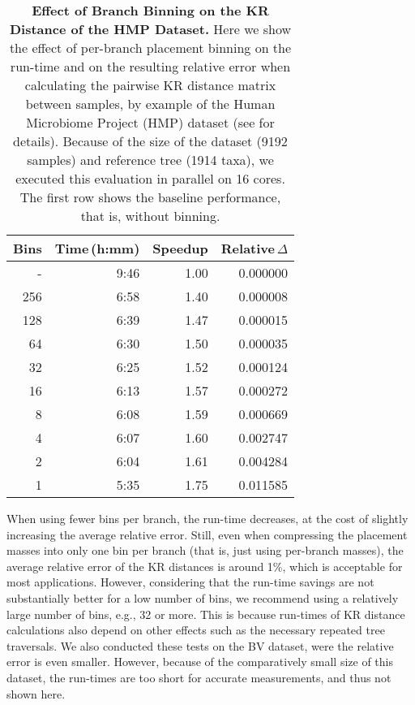 \begin{table}[htb]
\caption[Effect of Branch Binning on the KR Distance of the HMP Dataset]{
    \textbf{Effect of Branch Binning on the KR Distance of the HMP Dataset.}
    Here we show the effect of per-branch placement binning
    on the run-time and on the resulting relative error when calculating the pairwise KR distance matrix between samples,
    by example of the Human Microbiome Project (HMP) \cite{Huttenhower2012,Methe2012} dataset
    (see  for details).
    Because of the size of the dataset (\num{9192} samples) and reference tree (\num{1914} taxa),
    we executed this evaluation in parallel on \num{16} cores.
    The first row shows the baseline performance, that is, without binning.
}
\label{tab:hmp_binning_error}
{
    \begin{center}
    \begin{tabular}{rrrr}
        \toprule
        Bins    &  Time\,(h:mm) &  Speedup  &  Relative\,$\Delta$ \\
        \midrule
        -     & 9:46   & 1.00   & 0.000000 \\
        256   & 6:58   & 1.40   & 0.000008 \\
        128   & 6:39   & 1.47   & 0.000015 \\
        64    & 6:30   & 1.50   & 0.000035 \\
        32    & 6:25   & 1.52   & 0.000124 \\
        16    & 6:13   & 1.57   & 0.000272 \\
        8     & 6:08   & 1.59   & 0.000669 \\
        4     & 6:07   & 1.60   & 0.002747 \\
        2     & 6:04   & 1.61   & 0.004284 \\
        1     & 5:35   & 1.75   & 0.011585 \\
        \bottomrule
    \end{tabular}
    \end{center}
}
\end{table}

When using fewer bins per branch, the run-time decreases,
at the cost of slightly increasing the average relative error.
Still, even when compressing the placement masses into only one bin per branch (that is, just using per-branch masses),
the average relative error of the KR distances is around 1\%, which is acceptable for most applications.
However, considering that the run-time savings are not substantially better for a low number of bins,
we recommend using a relatively large number of bins, e.g., \num{32} or more.
This is because run-times of KR distance calculations also depend on other effects
such as the necessary repeated tree traversals.
We also conducted these tests on the \ac{BV} dataset, were the relative error is even smaller.
However, because of the comparatively small size of this dataset, the run-times are too short for accurate measurements,
and thus not shown here.

